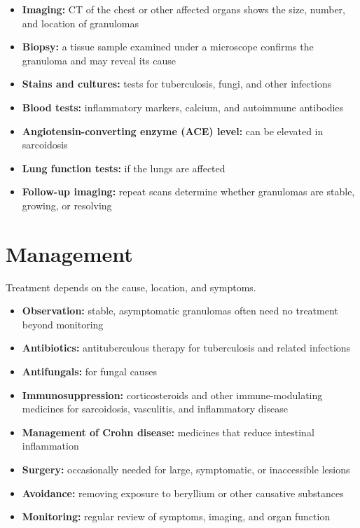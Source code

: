 \begin{itemize}
    \item \textbf{Imaging:} CT of the chest or other affected organs shows the size, number, and location of granulomas
    \item \textbf{Biopsy:} a tissue sample examined under a microscope confirms the granuloma and may reveal its cause
    \item \textbf{Stains and cultures:} tests for tuberculosis, fungi, and other infections
    \item \textbf{Blood tests:} inflammatory markers, calcium, and autoimmune antibodies
    \item \textbf{Angiotensin-converting enzyme (ACE) level:} can be elevated in sarcoidosis
    \item \textbf{Lung function tests:} if the lungs are affected
    \item \textbf{Follow-up imaging:} repeat scans determine whether granulomas are stable, growing, or resolving
\end{itemize}

\section*{Management}
Treatment depends on the cause, location, and symptoms.

\begin{itemize}
    \item \textbf{Observation:} stable, asymptomatic granulomas often need no treatment beyond monitoring
    \item \textbf{Antibiotics:} antituberculous therapy for tuberculosis and related infections
    \item \textbf{Antifungals:} for fungal causes
    \item \textbf{Immunosuppression:} corticosteroids and other immune-modulating medicines for sarcoidosis, vasculitis, and inflammatory disease
    \item \textbf{Management of Crohn disease:} medicines that reduce intestinal inflammation
    \item \textbf{Surgery:} occasionally needed for large, symptomatic, or inaccessible lesions
    \item \textbf{Avoidance:} removing exposure to beryllium or other causative substances
    \item \textbf{Monitoring:} regular review of symptoms, imaging, and organ function
\end{itemize}

